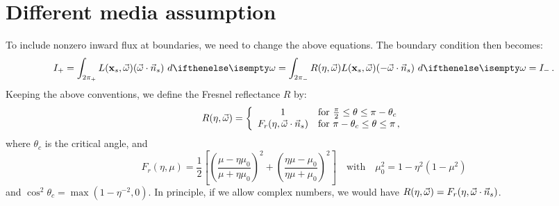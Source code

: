 \documentclass[10pt,a4paper]{article}
\begin{document}
\section{Different media assumption}

To include nonzero inward flux at boundaries, we need to change the above equations. The boundary condition then becomes:
\begin{equation}
I_+ = \hemisphere{L(\mathbf{x}_s, \omegavec) (\omegavec \cdot \vec{n}_s)}{} = \lowerhemisphere{R(\eta, \omegavec) L(\mathbf{x}_s, \omegavec) (-\omegavec \cdot \vec{n}_s)}{} = I_- \, .
\label{eq:diffb}
\end{equation}
Keeping the above conventions, we define the Fresnel reflectance $R$ by:
$$
R(\eta, \omegavec) =
\left\{\begin{array}{c@{\quad}l}
1 & \text{for $\frac{\pi}{2} \leq \theta \leq \pi - \theta_c$}\\
F_r(\eta, \omegavec\cdot\vec{n}_s) & \text{for $\pi - \theta_c \leq \theta \leq \pi$} \, ,
\end{array} \right.
$$
where $\theta_c$ is the critical angle, and
$$
F_r(\eta, \mu) = \frac{1}{2}\left[\left(\frac{\mu - \eta\mu_0}{\mu + \eta\mu_0}\right)^{\!2} + \left(\frac{\eta\mu - \mu_0}{\eta\mu + \mu_0}\right)^{\!2}\right] \quad \text{with} \quad \mu_0^2 = 1 - \eta^2(1 - \mu^2)
$$
and $\cos^2\theta_c = \max(1 - \eta^{-2}, 0)$.
In principle, if we allow complex numbers, we would have $R(\eta, \vec{\omega}) = F_r(\eta, \vec{\omega}\cdot\vec{n}_s)$.
\end{document}
